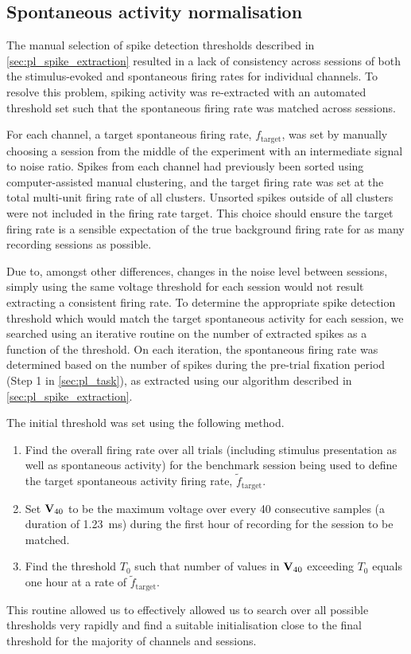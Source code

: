 \subsection{Spontaneous activity normalisation}
\label{sec:pl_san}

The manual selection of spike detection thresholds described in \autoref{sec:pl_spike_extraction} resulted in a lack of consistency across sessions of both the stimulus-evoked and spontaneous firing rates for individual channels.
To resolve this problem, spiking activity was re-extracted with an automated threshold set such that the spontaneous firing rate was matched across sessions.

For each channel, a target spontaneous firing rate, $f_\text{target}$, was set by manually choosing a session from the middle of the experiment with an intermediate signal to noise ratio.
Spikes from each channel had previously been sorted using computer-assisted manual clustering, and the target firing rate was set at the total multi-unit firing rate of all clusters.
Unsorted spikes outside of all clusters were not included in the firing rate target.
This choice should ensure the target firing rate is a sensible expectation of the true background firing rate for as many recording sessions as possible.

Due to, amongst other differences, changes in the noise level between sessions, simply using the same voltage threshold for each session would not result extracting a consistent firing rate.
To determine the appropriate spike detection threshold which would match the target spontaneous activity for each session, we searched using an iterative routine on the number of extracted spikes as a function of the threshold.
On each iteration, the spontaneous firing rate was determined based on the number of spikes during the pre-trial fixation period (Step \num{1} in \autoref{sec:pl_task}), as extracted using our algorithm described in \autoref{sec:pl_spike_extraction}.

The initial threshold was set using the following method.
\begin{enumerate}
\item Find the overall firing rate over all trials (including stimulus presentation as well as spontaneous activity) for the benchmark session being used to define the target spontaneous activity firing rate, $\tilde{f}_\text{target}$.
\item Set $\mathbf{V}_{40}$ to be the maximum voltage over every \num{40} consecutive samples (a duration of \SI{1.23}{\milli\second}) during the first hour of recording for the session to be matched.
\item Find the threshold $T_0$ such that number of values in $\mathbf{V}_{40}$ exceeding $T_0$ equals one hour at a rate of $\tilde{f}_\text{target}$.
\end{enumerate}
This routine allowed us to effectively allowed us to search over all possible thresholds very rapidly and find a suitable initialisation close to the final threshold for the majority of channels and sessions.


